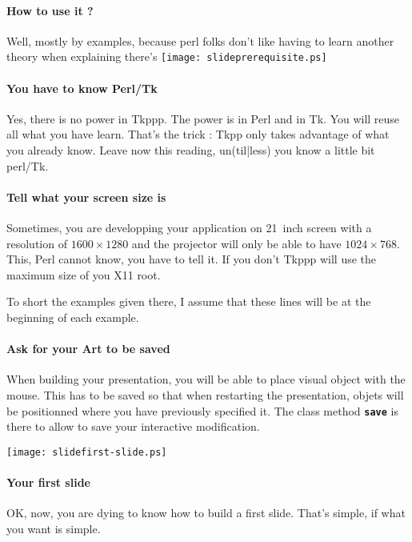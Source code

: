 \documentclass{article}
\begin{document}
\paragraph{How to use it ?}

Well, mostly by examples, because perl folks don't like having to
learn another theory when explaining there's
\newpage\texttt{[image: slideprerequisite.ps]}

\paragraph{You have to know Perl/Tk}

Yes, there is no power in Tkppp. The power is in Perl and in Tk. You
will reuse all what you have learn. That's the trick : Tkpp only takes
advantage of what you already know. Leave now this reading,
un(til|less) you know a little bit perl/Tk.

\paragraph{Tell what your screen size is}

Sometimes, you are developping your application on 21~inch screen with
a resolution of $1600 \times 1280$ and the projector will only be
able to have $ 1024 \times 768$. This, Perl cannot know, you have
to tell it. If you don't Tkppp will use the maximum size of you X11
root.

To short the examples given there, I assume that these lines will be
at the beginning of each example.

\paragraph{Ask for your Art to be saved}

When building your presentation, you will be able to place visual
object with the mouse. This has to be saved so that when restarting
the presentation, objets will be positionned where you have previously
specified it. The class method \texttt{\bf save} is there to allow
to save your interactive modification.


\newpage\texttt{[image: slidefirst-slide.ps]}

\paragraph{Your first slide}
OK, now, you are dying to know how to build a first
slide. That's simple, if what you want is simple.
\end{document}
